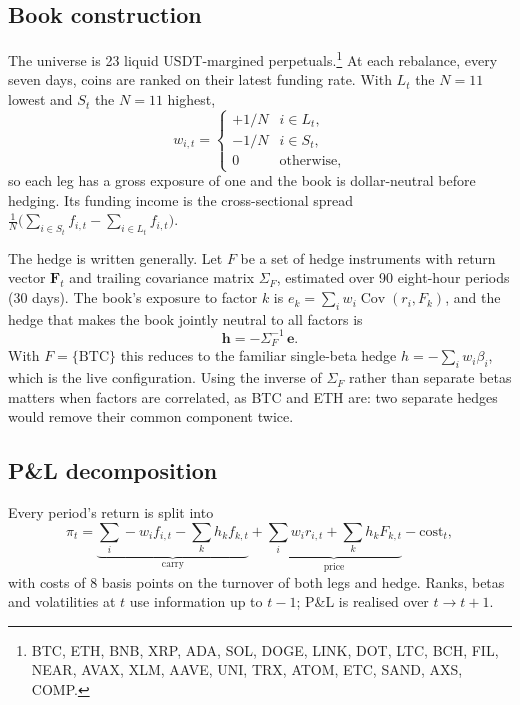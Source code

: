 \documentclass[11pt,a4paper]{article}
\begin{document}
\subsection{Book construction}

The universe is 23 liquid USDT-margined perpetuals.\footnote{BTC, ETH, BNB, XRP, ADA,
SOL, DOGE, LINK, DOT, LTC, BCH, FIL, NEAR, AVAX, XLM, AAVE, UNI, TRX, ATOM, ETC, SAND,
AXS, COMP.} At each rebalance, every seven days, coins are ranked on their latest
funding rate. With $L_t$ the $N=11$ lowest and $S_t$ the $N=11$ highest,
\begin{equation}
  w_{i,t} =
  \begin{cases}
    +1/N & i \in L_t,\\
    -1/N & i \in S_t,\\
    0 & \text{otherwise,}
  \end{cases}
\end{equation}
so each leg has a gross exposure of one and the book is dollar-neutral before
hedging. Its funding income is the cross-sectional spread
$\tfrac{1}{N}\big(\sum_{i\in S_t} f_{i,t} - \sum_{i\in L_t} f_{i,t}\big)$.

The hedge is written generally. Let $F$ be a set of hedge instruments with return
vector $\mathbf{F}_t$ and trailing covariance matrix $\Sigma_F$, estimated over 90
eight-hour periods (30 days). The book's exposure to factor $k$ is
$e_k = \sum_i w_i \operatorname{Cov}(r_i, F_k)$, and the hedge that makes the book
jointly neutral to all factors is
\begin{equation}\label{eq:hedge}
  \mathbf{h} = -\Sigma_F^{-1}\,\mathbf{e}.
\end{equation}
With $F=\{\text{BTC}\}$ this reduces to the familiar single-beta hedge
$h = -\sum_i w_i \beta_i$, which is the live configuration. Using the inverse of
$\Sigma_F$ rather than separate betas matters when factors are correlated, as BTC and
ETH are: two separate hedges would remove their common component twice.

\subsection{P\&L decomposition}

Every period's return is split into
\begin{equation}
  \pi_t = \underbrace{\textstyle\sum_i -w_i f_{i,t} - \sum_k h_k f_{k,t}}_{\text{carry}}
        + \underbrace{\textstyle\sum_i w_i r_{i,t} + \sum_k h_k F_{k,t}}_{\text{price}}
        - \text{cost}_t ,
\end{equation}
with costs of 8 basis points on the turnover of both legs and hedge. Ranks, betas and
volatilities at $t$ use information up to $t-1$; P\&L is realised over $t \to t+1$.
\end{document}
